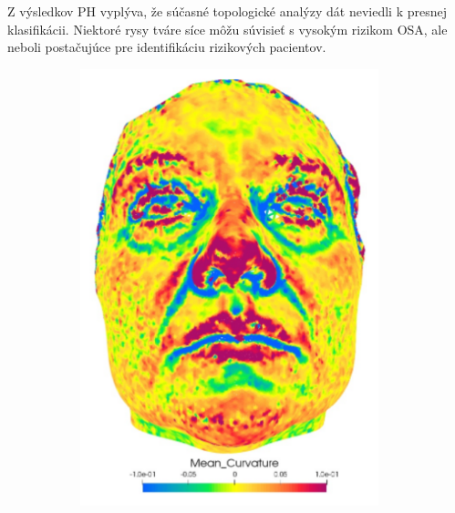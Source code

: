 Z výsledkov PH vyplýva, že súčasné topologické analýzy dát neviedli k presnej klasifikácii. Niektoré rysy tváre síce môžu súvisieť s vysokým rizikom OSA, ale neboli postačujúce pre identifikáciu rizikových pacientov. 


\begin{figure}[h]
	\centering
	\begin{subfigure}[b]{0.32\textwidth}
		\centering
		\includegraphics[width=0.95\textwidth]{figures/resers_a.png}
		\caption{}
		\label{fig:resers:a}
	\end{subfigure}
	\hfill
	\begin{subfigure}[b]{0.32\textwidth}
		\centering

\end{subfigure}
\end{figure}

